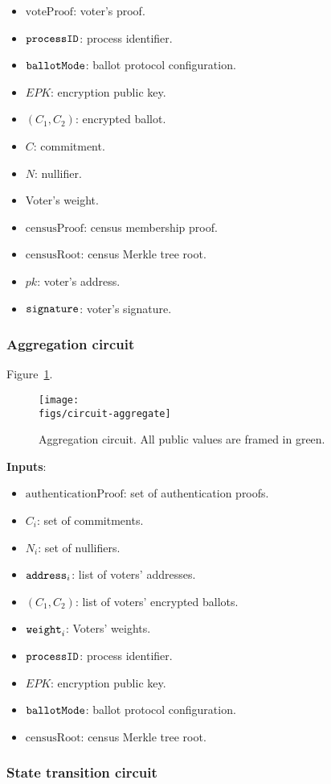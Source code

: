 \begin{itemize}
	\setlength\itemsep{1em}
		\item \public $\text{voteProof}$: voter's proof.
		\item \public $\texttt{processID}$: process identifier.
		\item \public $\texttt{ballotMode}$: ballot protocol configuration.
		\item \public $EPK$: encryption public key.
		\item \public $(C_1, C_2)$: encrypted ballot.
		\item \public $C$: commitment.
		\item \public $N$: nullifier.		
		\item \public Voter's weight.
		\item \public $\text{censusProof}$: census membership proof.
		\item \public $\text{censusRoot}$: census Merkle tree root.
		\item \public $pk$: voter's address.
		\item \public $\texttt{signature}$: voter's signature.
\end{itemize}

\newpage
\subsubsection{Aggregation circuit}

Figure~\ref{fig:circuit-aggregate}.

\begin{figure}[h]
	\centerline{\texttt{[image: \\figs/circuit-aggregate]}}
	\caption{Aggregation circuit. All public values are framed in green.}
	\label{fig:circuit-aggregate}
\end{figure}

\textbf{Inputs}:

\begin{itemize}
	\setlength\itemsep{1em}
	\item \public $\text{authenticationProof}$: set of authentication proofs.
	\item \public $C_i$: set of commitments.
	\item \public $N_i$: set of nullifiers.		
	\item \public $\texttt{address}_i$: list of voters' addresses.
	\item \public $(C_1, C_2)$: list of voters' encrypted ballots.
	\item \public $\texttt{weight}_i$: Voters' weights.
	\item \public $\texttt{processID}$: process identifier.
	\item \public $EPK$: encryption public key.
	\item \public $\texttt{ballotMode}$: ballot protocol configuration.
	\item \public $\text{censusRoot}$: census Merkle tree root.
\end{itemize}

\newpage
\subsubsection{State transition circuit}
